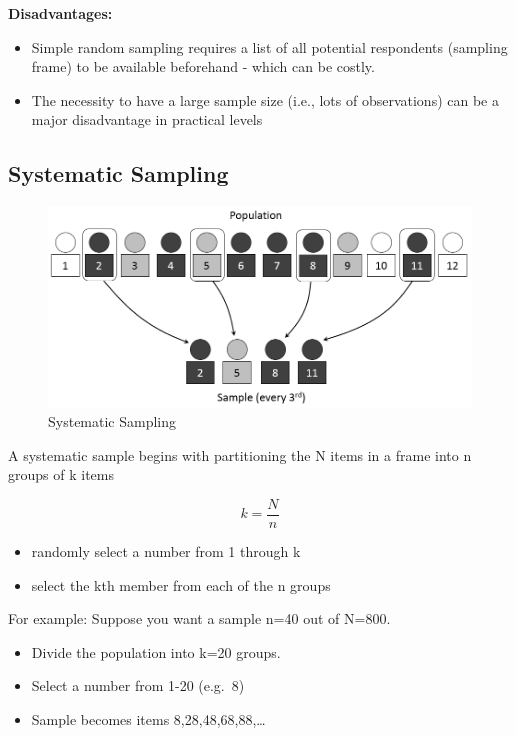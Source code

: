 \documentclass[
]{book}
\begin{document}
\textbf{Disadvantages:}

\begin{itemize}
\item
  Simple random sampling requires a list of all potential respondents (sampling frame) to be available beforehand - which can be costly.
\item
  The necessity to have a large sample size (i.e., lots of observations) can be a major disadvantage in practical levels
\end{itemize}

\subsection{Systematic Sampling}\label{systematic-sampling}

\begin{figure}

{\centering \includegraphics[width=0.7\linewidth]{images/Systematic} 

}

\caption{Systematic Sampling}\label{fig:unnamed-chunk-23}
\end{figure}

A systematic sample begins with partitioning the N items in a frame into n groups of k items

\[k=\frac{N}{n}\]

\begin{itemize}
\item
  randomly select a number from 1 through k
\item
  select the kth member from each of the n groups
\end{itemize}

For example: Suppose you want a sample n=40 out of N=800.

\begin{itemize}
\item
  Divide the population into k=20 groups.
\item
  Select a number from 1-20 (e.g.~8)
\item
  Sample becomes items 8,28,48,68,88,\ldots{}
\end{itemize}
\end{document}
